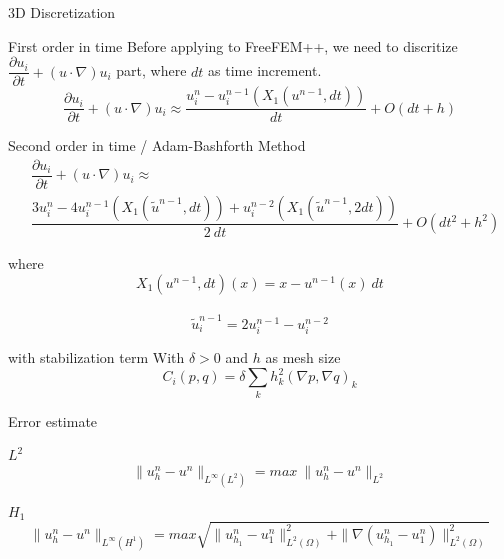 \documentclass{beamer}
\begin{document}
\begin{frame}{3D Discretization}
\begin{block}{First order in time}
	Before applying to FreeFEM++, we need to discritize $ \dfrac{\partial u_{i}}{\partial t} + (u \cdot \nabla)u_{i} $ part, where $ dt $ as time increment.
	\[ \dfrac{\partial u_{i}}{\partial t} + (u \cdot \nabla)u_{i} \approx \dfrac{u_{i}^{n}-u_{i}^{n-1}(X_{1}(u^{n-1},dt))}{dt} + O(dt+h) \]
\end{block}
\begin{block}{Second order in time / Adam-Bashforth Method}
	\begin{eqnarray}\nonumber
		&\dfrac{\partial u_{i}}{\partial t} + (u \cdot \nabla)u_{i} \approx\\ \nonumber &\dfrac{3u_{i}^{n}-4u_{i}^{n-1}(X_{1}(\tilde{u}^{n-1},dt))+u_{i}^{n-2}(X_{1}(\tilde{u}^{n-1},2dt))}{2\ dt} + O(dt^2+h^2)
	\end{eqnarray}
\end{block}
\end{frame}

\begin{frame}
\begin{block}{where}
	\[ X_{1}(u^{n-1},dt)(x) = x - u^{n-1}(x)\ dt\]\\
	\[\tilde{u}^{n-1}_{i} = 2u_{i}^{n-1}-u_{i}^{n-2}\]
\end{block}
\begin{block}{with stabilization term}
	With $ \delta>0 $ and $ h $ as mesh size
	\[ C_{i}(p,q) = \delta \sum_{k} h_{k}^{2}(\nabla p, \nabla q)_{k} \]
\end{block}
\end{frame}

\begin{frame}{Error estimate}
\begin{block}{$ L^{2} $}
	\[\| u_{h}^{n}-u^{n} \|_{L^\infty(L^2)} =  max \ \| u_{h}^{n}-u^{n} \|_{L^{2}}\]
\end{block}
\begin{block}{$ H_{1} $}
	\[\| u_{h}^{n}-u^{n} \|_{L^\infty(H^{1})} = max \sqrt{\| u_{h_{1}}^{n}-u_{1}^{n} \|_{L^2(\Omega)}^{2} + \| \nabla (u_{h_{1}}^{n}-u_{1}^{n}) \|_{L^2(\Omega)}^{2}}\]
\end{block}
\end{frame}
\end{document}
